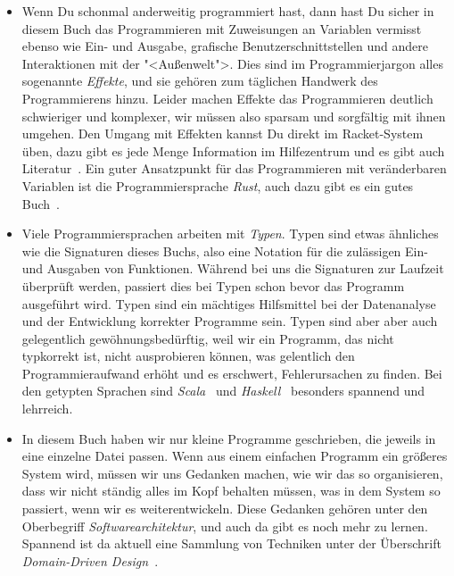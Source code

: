 \begin{itemize}
\item Wenn Du schonmal anderweitig programmiert hast, dann hast Du
  sicher in diesem Buch das Programmieren mit Zuweisungen an Variablen
  vermisst ebenso wie Ein- und Ausgabe, grafische
  Benutzerschnittstellen und andere Interaktionen mit der
  "<Außenwelt">.  Dies sind im Programmierjargon alles sogenannte
  \textit{Effekte}, und sie gehören zum täglichen
  Handwerk des Programmierens hinzu.  Leider machen Effekte das
  Programmieren deutlich schwieriger und komplexer, wir müssen also
  sparsam und sorgfältig mit ihnen umgehen. Den Umgang mit Effekten
  kannst Du direkt im Racket-System üben, dazu gibt es jede Menge
  Information im Hilfezentrum und es gibt auch
  Literatur~\cite{FelleisenEtAll2013}.  Ein guter Ansatzpunkt für das
  Programmieren mit veränderbaren Variablen ist die Programmiersprache
  \textit{Rust}, auch dazu gibt es ein gutes
  Buch~\cite{KlabnikNichols2018}.
\item Viele Programmiersprachen arbeiten mit
  \textit{Typen}.  Typen sind etwas ähnliches wie die
  Signaturen dieses Buchs, also eine Notation für die zulässigen Ein-
  und Ausgaben von Funktionen.  Während bei uns die Signaturen zur
  Laufzeit überprüft werden, passiert dies bei Typen schon bevor das
  Programm ausgeführt wird.  Typen sind ein mächtiges Hilfsmittel bei
  der Datenanalyse und der Entwicklung korrekter Programme sein.
  Typen sind aber aber auch gelegentlich gewöhnungsbedürftig, weil wir
  ein Programm, das nicht typkorrekt ist, nicht ausprobieren können,
  was gelentlich den Programmieraufwand erhöht und es erschwert,
  Fehlerursachen zu finden.  Bei den getypten Sprachen sind
  \textit{Scala}~\cite{ChiusanoBjarnason2014} und
  \textit{Haskell}~\cite{Hutton2016} besonders spannend und
  lehrreich.
\item In diesem Buch haben wir nur kleine Programme geschrieben, die
  jeweils in eine einzelne Datei passen.  Wenn aus einem einfachen
  Programm ein größeres System wird, müssen wir uns Gedanken machen,
  wie wir das so organisieren, dass wir nicht ständig alles im Kopf
  behalten müssen, was in dem System so passiert, wenn wir es
  weiterentwickeln.  Diese Gedanken gehören unter den Oberbegriff
  \textit{Softwarearchitektur}, und auch da
  gibt es noch mehr zu lernen.  Spannend ist da aktuell eine Sammlung
  von Techniken unter der Überschrift \textit{Domain-Driven
    Design}~\cite{Evans2004}.
\end{itemize}
